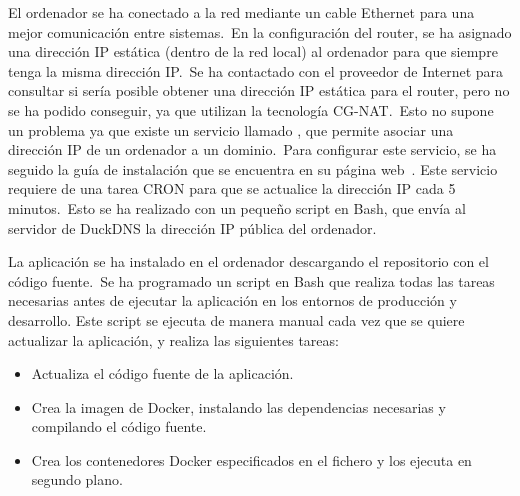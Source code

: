 El ordenador se ha conectado a la red mediante un cable Ethernet para una mejor comunicación entre sistemas.\
En la configuración del router, se ha asignado una dirección IP estática (dentro de la red local) al
ordenador para que siempre tenga la misma dirección IP.\ Se ha contactado con el proveedor de Internet para consultar
si sería posible obtener una dirección IP estática para el router, pero no se ha podido conseguir, ya que
utilizan la tecnología CG-NAT.\ Esto no supone un problema ya que existe un servicio llamado , que
permite asociar una dirección IP de un ordenador a un dominio.\ Para configurar este servicio, se ha seguido la guía
de instalación que se encuentra en su página web~\cite{DuckDNSi96:online}.
Este servicio requiere de una tarea CRON para que se actualice la dirección IP cada 5 minutos.\ Esto se ha realizado
con un pequeño script en Bash, que envía al servidor de DuckDNS la dirección IP pública del ordenador.


La aplicación se ha instalado en el ordenador descargando el repositorio con el código fuente.\ Se ha programado un
script
en Bash que realiza todas las tareas necesarias antes de ejecutar la aplicación en los entornos de producción y
desarrollo.
Este script se ejecuta de manera manual cada vez que se quiere actualizar la aplicación, y realiza las siguientes
tareas:
\begin{itemize}
	\item Actualiza el código fuente de la aplicación.
	\item Crea la imagen de Docker, instalando las dependencias necesarias y compilando el código fuente.
	\item Crea los contenedores Docker especificados en el fichero \monoFont{docker-compose.yaml} y los ejecuta
	en segundo plano.
\end{itemize}
\label{itm:script_tasks}

